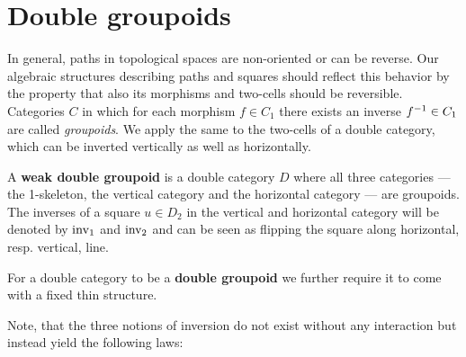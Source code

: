 \section{Double groupoids}

In general, paths in topological spaces are non-oriented or can be reverse.
Our algebraic structures describing paths and squares should reflect this behavior
by the property that also its morphisms and two-cells should be reversible.
Categories $C$ in which for each morphism $f \in C_1$ there exists an inverse
$f^{-1} \in C_1$ are called \emph{groupoids}. We apply the same to the two-cells of a
double category, which can be inverted vertically as well as horizontally.

\begin{defn} \label{def:weak-dbl-gpd}
A \textbf{weak double groupoid} is a double category $D$ where all three categories
--- the 1-skeleton, the vertical category and the horizontal category --- are
groupoids. The inverses of a square $u \in D_2$ in the vertical and horizontal category 
will be denoted by $\operatorname{inv_1}$ and $\operatorname{inv_2}$ and can be seen as flipping the square
along horizontal, resp. vertical, line.

For a double category to be a \textbf{double groupoid} we further require it to
come with a fixed thin structure.
\end{defn}

Note, that the three notions of inversion do not exist without any interaction
but instead yield the following laws:

